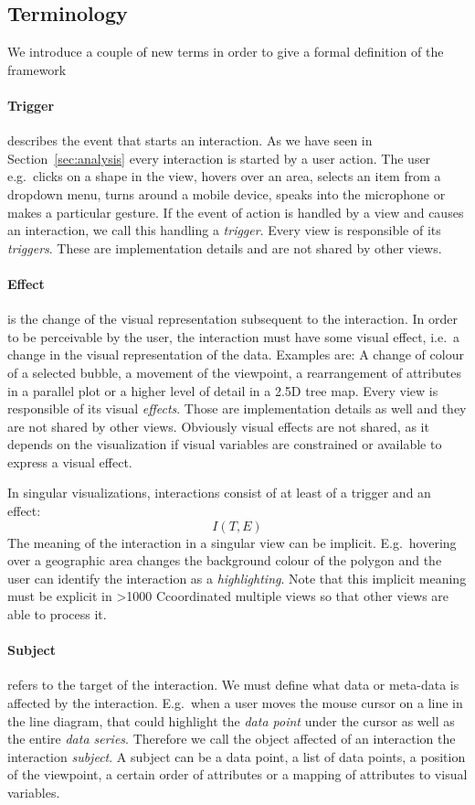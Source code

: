 \documentclass{article}
\newcommand\hmm[1]{\ifnum\ifhmode\spacefactor\else2000\fi>1000 \uppercase{#1}\else#1\fi}
\newcommand{\cmvs}{\hmm{c}oordinated multiple views}
\newcommand{\tmap}{\textsc{2.5D} tree map}
\begin{document}
\subsection{Terminology}
We introduce a couple of new terms in order to give a formal definition of the framework

\paragraph{Trigger} describes the event that starts an interaction.
As we have seen in Section~\ref{sec:analysis} every interaction is started by a user action.
The user e.g.\ clicks on a shape in the view, hovers over an area, selects an item from a dropdown menu, turns around a mobile device, speaks into the microphone or makes a particular gesture.
If the event of action is handled by a view and causes an interaction, we call this handling a \emph{trigger}.
Every view is responsible of its \emph{triggers}.
These are implementation details and are not shared by other views.

\paragraph{Effect} is the change of the visual representation subsequent to the interaction.
In order to be perceivable by the user, the interaction must have some visual effect, i.e.\ a change in the visual representation of the data.
Examples are:
A change of colour of a selected bubble, a movement of the viewpoint, a rearrangement of attributes in a parallel plot or a higher level of detail in a \tmap{}.
Every view is responsible of its visual \emph{effects}.
Those are implementation details as well and they are not shared by other views.
Obviously visual effects are not shared, as it depends on the visualization if visual variables are constrained or available to express a visual effect.

In singular visualizations, interactions consist of at least of a trigger and an effect:
\begin{equation}
  I(T, E)
\end{equation}
The meaning of the interaction in a singular view can be implicit.
E.g.\ hovering over a geographic area changes the background colour of the polygon and the user can identify the interaction as a \emph{highlighting}.
Note that this implicit meaning must be explicit in \cmvs{} so that other views are able to process it.


\paragraph{Subject} refers to the target of the interaction.
We must define what data or meta-data is affected by the interaction.
E.g.\ when a user moves the mouse cursor on a line in the line diagram, that could highlight the \emph{data point} under the cursor as well as the entire \emph{data series}.
Therefore we call the object affected of an interaction the interaction \emph{subject}.
A subject can be a data point, a list of data points, a position of the viewpoint, a certain order of attributes or a mapping of attributes to visual variables.
\end{document}
